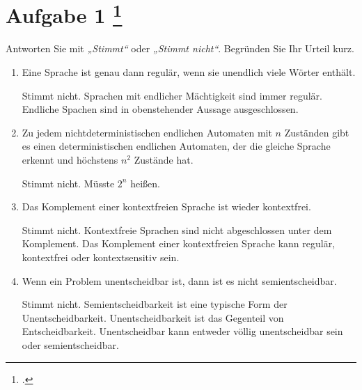 \documentclass{lehramt-informatik-aufgabe}
\begin{document}
\section{Aufgabe 1
\footcite{examen:66115:2020:09}}

Antworten Sie mit \emph{„Stimmt“} oder \emph{„Stimmt nicht“}. Begründen
Sie Ihr Urteil kurz.


\begin{enumerate}


\item Eine Sprache ist genau dann regulär, wenn sie unendlich viele
Wörter enthält.

\begin{liAntwort}
Stimmt nicht. Sprachen mit endlicher Mächtigkeit sind immer regulär.
Endliche Spachen sind in obenstehender Aussage ausgeschlossen.
\end{liAntwort}


\item Zu jedem nichtdeterministischen endlichen Automaten mit $n$
Zuständen gibt es einen deterministischen endlichen Automaten, der die
gleiche Sprache erkennt und höchstens $n^2$ Zustände hat.

\begin{liAntwort}
Stimmt nicht. Müsste $2^n$ heißen.
\end{liAntwort}


\item Das Komplement einer kontextfreien Sprache ist wieder kontextfrei.

\begin{liAntwort}
Stimmt nicht. Kontextfreie Sprachen sind nicht abgeschlossen unter dem
Komplement. Das Komplement einer kontextfreien Sprache kann regulär,
kontextfrei oder kontextsensitiv sein.
\end{liAntwort}


\item Wenn ein Problem unentscheidbar ist, dann ist es nicht
semientscheidbar.

\begin{liAntwort}
Stimmt nicht. Semientscheidbarkeit ist eine typische Form der
Unentscheidbarkeit. Unentscheidbarkeit ist das Gegenteil von
Entscheidbarkeit. Unentscheidbar kann entweder völlig unentscheidbar
sein oder semientscheidbar.
\end{liAntwort}


\end{enumerate}
\end{document}
